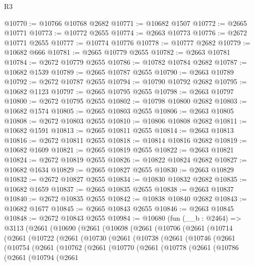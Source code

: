 \begin{lexlean}{R3}
\begin{coremodule}
@10770 := @10766 @10768 @2682
@10771 := @10682 @1507
@10772 := @2665 @10771
@10773 := @10772 @2655
@10774 := @2663 @10773
@10776 := @2672 @10771 @2655
@10777 := @10774 @10776
@10778 := @10777 @2682
@10779 := @10682 @666
@10781 := @2665 @10779 @2655
@10782 := @2663 @10781
@10784 := @2672 @10779 @2655
@10786 := @10782 @10784 @2682
@10787 := @10682 @1539
@10789 := @2665 @10787 @2655
@10790 := @2663 @10789
@10792 := @2672 @10787 @2655
@10794 := @10790 @10792 @2682
@10795 := @10682 @1123
@10797 := @2665 @10795 @2655
@10798 := @2663 @10797
@10800 := @2672 @10795 @2655
@10802 := @10798 @10800 @2682
@10803 := @10682 @1574
@10805 := @2665 @10803 @2655
@10806 := @2663 @10805
@10808 := @2672 @10803 @2655
@10810 := @10806 @10808 @2682
@10811 := @10682 @1591
@10813 := @2665 @10811 @2655
@10814 := @2663 @10813
@10816 := @2672 @10811 @2655
@10818 := @10814 @10816 @2682
@10819 := @10682 @1609
@10821 := @2665 @10819 @2655
@10822 := @2663 @10821
@10824 := @2672 @10819 @2655
@10826 := @10822 @10824 @2682
@10827 := @10682 @1634
@10829 := @2665 @10827 @2655
@10830 := @2663 @10829
@10832 := @2672 @10827 @2655
@10834 := @10830 @10832 @2682
@10835 := @10682 @1659
@10837 := @2665 @10835 @2655
@10838 := @2663 @10837
@10840 := @2672 @10835 @2655
@10842 := @10838 @10840 @2682
@10843 := @10682 @1677
@10845 := @2665 @10843 @2655
@10846 := @2663 @10845
@10848 := @2672 @10843 @2655
@10984 := @10680
    (fun (__b : @2464) =>
    @3113
      (@2661
        (@10690
          (@2661
            (@10698
              (@2661
                (@10706
                  (@2661
                    (@10714
                      (@2661
                        (@10722
                          (@2661
                            (@10730
                              (@2661
                                (@10738
                                  (@2661
                                    (@10746
                                      (@2661
                                        (@10754
                                          (@2661
                                            (@10762
                                              (@2661
                                                (@10770
                                                  (@2661
                                                    (@10778
                                                      (@2661
                                                        (@10786
                                                          (@2661
                                                            (@10794
                                                              (@2661

\end{coremodule}
\end{lexlean}
